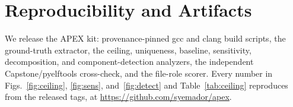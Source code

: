 \documentclass[conference]{IEEEtran}
\begin{document}
\section*{Reproducibility and Artifacts}
We release the APEX kit: provenance-pinned gcc and clang build scripts, the
ground-truth extractor, the ceiling, uniqueness, baseline, sensitivity, decomposition,
and component-detection analyzers, the independent Capstone/pyelftools cross-check, and
the file-role scorer. Every number in Figs.~\ref{fig:ceiling}, \ref{fig:sens},
and~\ref{fig:detect} and Table~\ref{tab:ceiling} reproduces from the released tags, at
\url{https://github.com/syemador/apex}.



\end{document}
